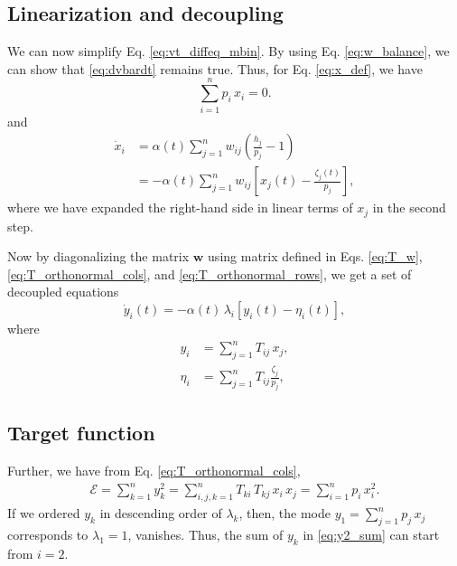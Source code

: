 \documentclass[reprint]{revtex4-1}
\begin{document}
\subsection{Linearization and decoupling}



We can now simplify Eq. \eqref{eq:vt_diffeq_mbin}.
%
By using Eq. \eqref{eq:w_balance},
we can show that \eqref{eq:dvbardt} remains true.
%
Thus, for Eq. \eqref{eq:x_def}, we have
%
\begin{equation}
  \sum_{i=1}^n p_i \, x_i = 0.
\end{equation}
%
and
%
$$
\begin{aligned}
\dot x_i
&= \alpha(t) \sum_{j=1}^n w_{ij}
\left( \frac{ h_j } { p_j }  - 1 \right)
\\
&=
-\alpha(t) \sum_{j = 1}^n
w_{ij} \left[ x_j(t) - \frac{\zeta_j (t)}{p_j} \right],
\end{aligned}
$$
where
we have expanded the right-hand side
in linear terms of $x_j$ in the second step.


Now by diagonalizing the matrix $\mathbf w$
using matrix defined in Eqs. \eqref{eq:T_w},
\eqref{eq:T_orthonormal_cols},
and
\eqref{eq:T_orthonormal_rows},
we get a set of decoupled equations
%
\begin{equation}
\dot y_i(t)
=
-\alpha(t) \, \lambda_i
[y_i(t) - \eta_i(t)],
\label{eq:yt_diffeq}
\end{equation}
%
where
\begin{align}
  y_i &= \sum_{j=1}^n T_{ij} \, x_j,
  \label{eq:y_def}
  \\
  \eta_i &= \sum_{j=1}^n T_{ij} \frac{ \zeta_j}{ p_j},
  \label{eq:eta_def}
\end{align}


\subsection{Target function}


Further, we have from Eq. \eqref{eq:T_orthonormal_cols},
\begin{align}
  \mathcal E
  =
  \sum_{k = 1}^n y_k^2
  =
  \sum_{i, j, k=1}^n T_{ki} \, T_{kj} \, x_i \, x_j
  = \sum_{i = 1}^n p_i \, x_i^2.
  \label{eq:y2_sum}
\end{align}
%
If we ordered $y_k$ in descending order of $\lambda_k$,
%
then, the mode $y_1 = \sum_{j=1}^n p_j \, x_j$
corresponds to $\lambda_1 = 1$,
vanishes.
%
Thus, the sum of $y_k$ in \eqref{eq:y2_sum}
can start from $i = 2$.
\end{document}
